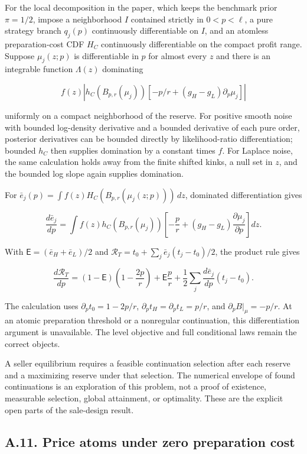 \documentclass[
  11pt,
]{article}
\begin{document}
For the local decomposition in the paper, which keeps the benchmark prior
\(\pi=1/2\), impose a neighborhood \(I\) contained strictly in \(0<p<\ell\), a pure strategy branch
\(q_j(p)\) continuously differentiable on \(I\), and an atomless
preparation-cost CDF \(H_C\) continuously differentiable on the compact
profit range. Suppose \(\mu_j(z;p)\) is differentiable in \(p\) for
almost every \(z\) and there is an integrable function \(\Lambda(z)\)
dominating

\[
f(z)\left|h_C(B_{p,r}(\mu_j))\left[-p/r+(g_H-g_L)\partial_p\mu_j\right]\right|
\tag{OA.54}\label{eq:oa-oa-54}
\]

uniformly on a compact neighborhood of the reserve. For
positive smooth noise with bounded log-density derivative and a bounded
derivative of each pure order, posterior derivatives can be bounded
directly by likelihood-ratio differentiation; bounded \(h_C\) then
supplies domination by a constant times \(f\). For Laplace noise, the
same calculation holds away from the finite shifted kinks, a null set in
\(z\), and the bounded log slope again supplies domination.

For \(\bar e_j(p)=\int f(z)H_C(B_{p,r}(\mu_j(z;p)))\,dz\),
dominated differentiation gives

\[
\frac{d\bar e_j}{dp}
=\int f(z)h_C(B_{p,r}(\mu_j))
\left[-\frac p r+(g_H-g_L)\frac{\partial\mu_j}{\partial p}\right]dz.
\tag{OA.55}\label{eq:oa-oa-55}
\]

With \(\mathsf E=(\bar e_H+\bar e_L)/2\) and
\(\mathcal R_T=t_0+\sum_j\bar e_j(t_j-t_0)/2\), the
product rule gives

\[
\frac{d\mathcal R_T}{dp}
=(1-\mathsf E)\left(1-\frac{2p}{r}\right)+\mathsf E\frac p r
+\frac12\sum_j\frac{d\bar e_j}{dp}(t_j-t_0).
\tag{OA.56}\label{eq:oa-oa-56}
\]

The calculation uses \(\partial_pt_0=1-2p/r\),
\(\partial_pt_H=\partial_pt_L=p/r\), and \(\partial_pB|_\mu=-p/r\). At
an atomic preparation threshold or a nonregular continuation, this
differentiation argument is unavailable. The level objective and full
conditional laws remain the correct objects.

A seller equilibrium requires a feasible continuation selection after
each reserve and a maximizing reserve under that selection. The
numerical envelope of found continuations is an exploration of this
problem, not a proof of existence, measurable selection, global
attainment, or optimality. These are the explicit open parts of the
sale-design result.

\subsection{A.11. Price atoms under zero preparation
cost}\label{oa-a-pools}
\end{document}
